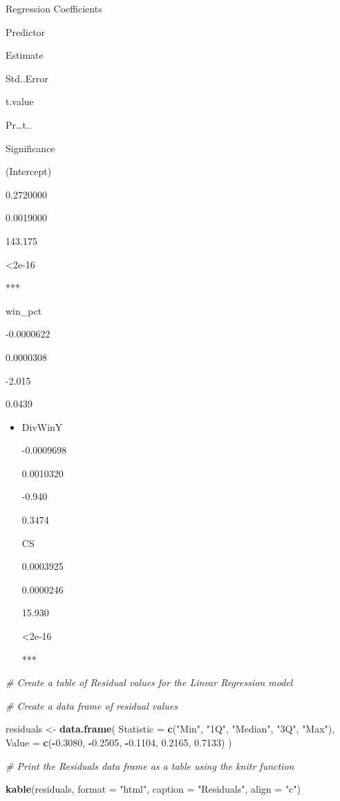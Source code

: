 \documentclass[
]{article}
\newenvironment{Shaded}{\begin{snugshade}}{\end{snugshade}}
\newcommand{\AttributeTok}[1]{\textcolor[rgb]{0.13,0.29,0.53}{#1}}
\newcommand{\CommentTok}[1]{\textcolor[rgb]{0.56,0.35,0.01}{\textit{#1}}}
\newcommand{\FloatTok}[1]{\textcolor[rgb]{0.00,0.00,0.81}{#1}}
\newcommand{\FunctionTok}[1]{\textcolor[rgb]{0.13,0.29,0.53}{\textbf{#1}}}
\newcommand{\NormalTok}[1]{#1}
\newcommand{\OtherTok}[1]{\textcolor[rgb]{0.56,0.35,0.01}{#1}}
\newcommand{\SpecialCharTok}[1]{\textcolor[rgb]{0.81,0.36,0.00}{\textbf{#1}}}
\newcommand{\StringTok}[1]{\textcolor[rgb]{0.31,0.60,0.02}{#1}}
\begin{document}
Regression Coefficients

Predictor

Estimate

Std..Error

t.value

Pr\ldots t..

Significance

(Intercept)

0.2720000

0.0019000

143.175

\textless2e-16

***

win\_pct

-0.0000622

0.0000308

-2.015

0.0439

\begin{itemize}
\item
  DivWinY

  -0.0009698

  0.0010320

  -0.940

  0.3474

  CS

  0.0003925

  0.0000246

  15.930

  \textless2e-16

  ***
\end{itemize}

\begin{Shaded}
\begin{Highlighting}[]
\CommentTok{\# Create a table of Residual values for the Linear Regression model}

\CommentTok{\# Create a data frame of residual values}

\NormalTok{residuals }\OtherTok{\textless{}{-}} \FunctionTok{data.frame}\NormalTok{(}
  \AttributeTok{Statistic =} \FunctionTok{c}\NormalTok{(}\StringTok{"Min"}\NormalTok{, }\StringTok{"1Q"}\NormalTok{, }\StringTok{"Median"}\NormalTok{, }\StringTok{"3Q"}\NormalTok{, }\StringTok{"Max"}\NormalTok{),}
  \AttributeTok{Value =} \FunctionTok{c}\NormalTok{(}\SpecialCharTok{{-}}\FloatTok{0.3080}\NormalTok{, }\SpecialCharTok{{-}}\FloatTok{0.2505}\NormalTok{, }\SpecialCharTok{{-}}\FloatTok{0.1104}\NormalTok{, }\FloatTok{0.2165}\NormalTok{, }\FloatTok{0.7133}\NormalTok{)}
\NormalTok{)}

\CommentTok{\# Print the Residuals data frame as a table using the knitr function}

\FunctionTok{kable}\NormalTok{(residuals, }\AttributeTok{format =} \StringTok{"html"}\NormalTok{, }\AttributeTok{caption =} \StringTok{"Residuals"}\NormalTok{, }\AttributeTok{align =} \StringTok{"c"}\NormalTok{)}
\end{Highlighting}
\end{Shaded}
\end{document}
